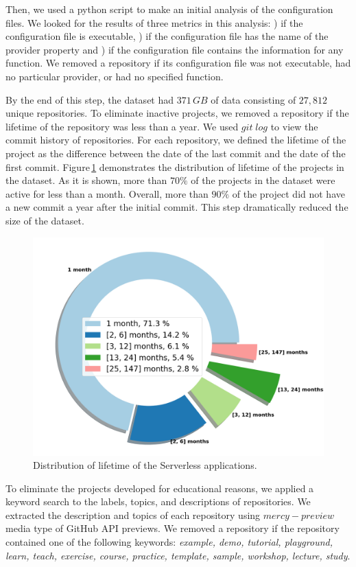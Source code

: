 Then, we used a python script to make an initial analysis of the 
configuration files. We looked for the results of three metrics in this 
analysis: ) if the configuration file is executable, ) if 
the configuration file has the name of the provider property and 
) if the configuration file contains the information for any 
function. We removed a repository if its configuration file was not 
executable, had no particular provider, or had no specified function.

By the end of this step, the dataset had $371 \, GB$ of data consisting 
of $27,812$ unique repositories. To eliminate inactive projects, we 
removed a repository if the lifetime of the repository was less than 
a year. We used $git \; log$ to view the commit history of repositories. 
For each repository, we defined the lifetime of the project as the difference 
between the date of the last commit and the date of the first commit. 
Figure\,\ref{fig:lifetime} demonstrates the distribution of lifetime of the 
projects in the dataset. As it is shown, more than $70\%$ of the projects 
in the dataset were active for less than a month. Overall, more than $90\%$ 
of the project did not have a new commit a year after the initial commit. 
This step dramatically reduced the size of the dataset.

\begin{figure}
	\centering
	\includegraphics[scale=0.25]{figures/lifetime}
	\caption{Distribution of lifetime of the Serverless applications.}
	\label{fig:lifetime}
\end{figure}

To eliminate the projects developed for educational reasons, 
we applied a keyword search to the labels, topics, and 
descriptions of repositories. We extracted the description 
and topics of each repository using $mercy-preview$ media 
type of GitHub API previews. We removed a repository 
if the repository contained one of the following keywords: 
\emph{example, demo, tutorial, playground, learn, teach, exercise, 
	course, practice, template, sample, workshop, lecture, study}.

